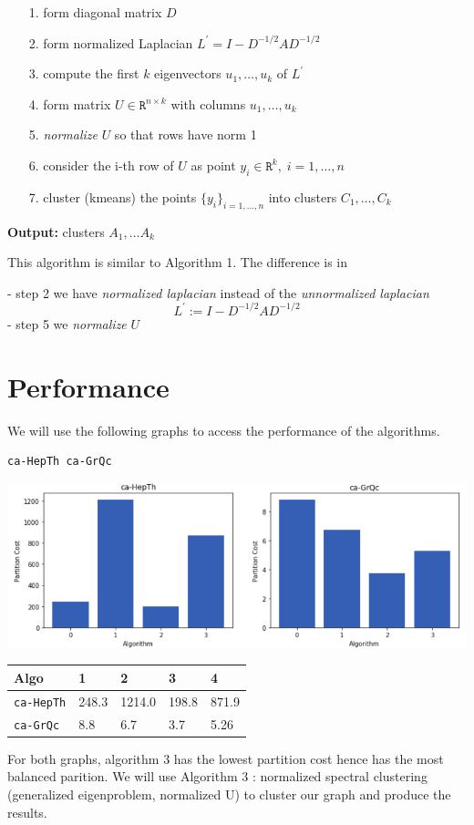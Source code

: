 \documentclass[a4paper,12pt]{article}
\begin{document}
\begin{itemize}
\item[1. ] form diagonal matrix $D$
\item[2. ] form normalized Laplacian $L^\prime = I - D^{-1/2} A D^{-1/2}$

\item[3. ] compute the first $k$ eigenvectors $u_1 , \dots, u_k$ of $L^\prime$

\item[4. ] form matrix $U \in \texttt{R}^{n \times k}$ with columns $u_1, \dots, u_k$

\item[5. ] \textit{normalize} $U$ so that rows have norm 1
\item[6. ] consider the i-th row of $U$ as point $y_i \in \texttt{R}^k, \; i=1, \dots, n$
\item[7. ] cluster (kmeans) the points $\{y_i\}_{i=1, \dots, n}$ into clusters $C_1, \dots, C_k$
\end{itemize}

\textbf{Output:} clusters $A_1, \dots A_k$

This algorithm is similar to 
Algorithm 1. The difference is in

- step 2 we have \textit{normalized laplacian} instead of the \textit{unnormalized laplacian} $$L^\prime := I - D^{-1/2} A D^{-1/2}$$
- step 5 we \textit{normalize} $U$

\section{Performance}
We will use the following graphs to access the performance of the algorithms.
\begin{verbatim}
ca-HepTh ca-GrQc
\end{verbatim}

\includegraphics[width=\textwidth]{performance}

\begin{table}[h]
  \centering
\begin{tabular}{|l|l|l|l|l|}
\hline
Algo & 1 & 2 & 3 & 4 \\ \hline
\hline
\texttt{ca-HepTh} & 248.3 & 1214.0 & 198.8 & 871.9 \\ \hline
\texttt{ca-GrQc} & 8.8 & 6.7 & 3.7 & 5.26 \\ \hline
\end{tabular}
\end{table}

For both graphs, algorithm 3 has the lowest partition cost hence has the most balanced parition.
We will use Algorithm 3 : normalized spectral clustering (generalized eigenproblem, normalized U) to cluster our graph and produce the results.
\end{document}
